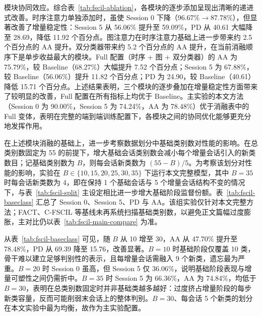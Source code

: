 模块协同效应。综合表~\ref{tab:fscil-ablation}，各模块的逐步添加呈现出清晰的递进式改善。时序注意力单独添加时，虽使 Session 0 下降（96.67\%$\to$87.78\%），但显著改善了增量稳定性：Session 5 从 56.06\% 提升至 59.09\%，PD 从 40.61 大幅降至 28.69，降低 11.92 个百分点。图注意力在时序注意力基础上进一步带来约 2.5 个百分点的 AA 提升。双分类器带来约 5.2 个百分点的 AA 提升，在当前消融顺序下是单步收益最大的模块。Full 配置（时序 + 图 + 双分类器）的 AA 为 75.79\%，较 Baseline（68.27\%）大幅提升 7.52 个百分点；Session 5 为 67.88\%，较 Baseline（56.06\%）提升 11.82 个百分点；PD 为 24.90，较 Baseline（40.61）降低 15.71 个百分点。上述结果表明，三个模块的逐步叠加在增量稳定性方面带来了较明显的改善，Full 配置在所有指标上均优于 Baseline。主实验的本文方法（Session 0 为 90.00\%，Session 5 为 74.24\%，AA 为 78.48\%）优于消融表中的 Full 变体，表明在完整的端到端训练配置下，各模块之间的协同优化能够更充分地发挥作用。


在上述模块消融的基础上，进一步考察数据划分中基础类别数对性能的影响。在总类别数固定为 55 的前提下，增大基础会话类别数会减小每个增量会话引入的新类数目；记基础类别数为 $B$，则每会话新类数为 $(55-B)/5$。为考察该划分对性能的影响，实验在 $B \in \{10, 15, 20, 25, 30, 35\}$ 下运行本文完整模型，其中 $B=35$ 时每会话新类数为 4，即在保持 1 个基础会话与 5 个增量会话结构不变的情况下，与表~\ref{tab:fscil-split} 主设定相比进一步增大基础阶段监督份额。表~\ref{tab:fscil-baseclass} 汇总了 Session 0、Session 5、PD 与 AA。该组实验仅针对本文完整方法；FACT、C-FSCIL 等基线未再系统扫描基础类别数，以避免正文篇幅过度膨胀，主对比仍以表~\ref{tab:fscil-main-compare} 为准。

从表~\ref{tab:fscil-baseclass} 可见，随 $B$ 从 10 增至 30，AA 从 47.70\% 提升至 78.48\%，PD 从 69.39 降至 15.76，改善显著。$B=10$ 时基础阶段仅覆盖 10 类，骨干难以建立足够判别性的表示，且每增量会话需融入 9 个新类，遗忘最为严重。$B=20$ 时 Session 0 虽高，但 Session 5 仅 36.06\%，说明基础阶段表现与增量可塑性之间仍需折中。$B=35$ 时 Session 5 为 66.36\%，AA 为 74.84\%，均低于 $B=30$，表明在总类别数固定时并非基础类越多越好：过度挤占增量阶段的每步新类容量，反而可能削弱末会话上的整体判别。$B=30$、每会话 5 个新类的划分在本文实验中最为均衡，故作为主实验配置。

